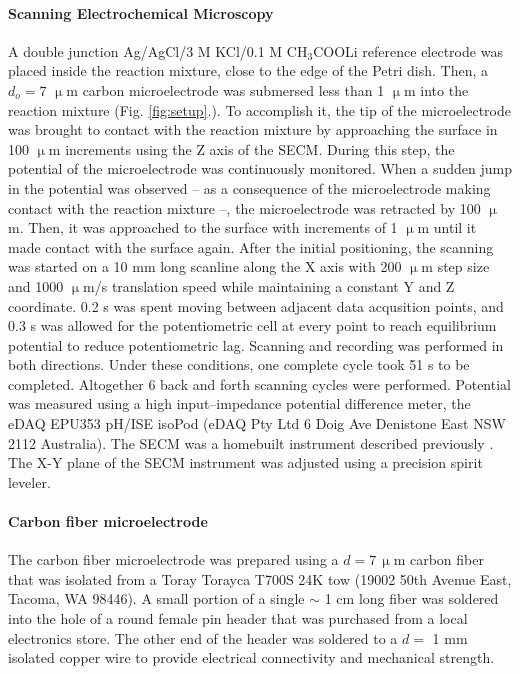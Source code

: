 \documentclass[3p, twocolumn]{elsarticle}
\begin{document}
\paragraph{Scanning Electrochemical Microscopy} A double junction Ag/AgCl/3 M KCl/0.1 M CH$_3$COOLi reference electrode was placed inside the reaction mixture, close to the edge of the Petri dish.
Then, a $d_o=7$ $\upmu$m carbon microelectrode was submersed less than 1 $\upmu$m into the reaction mixture (Fig. \ref{fig:setup}.).
To accomplish it, the tip of the microelectrode was brought to contact with the reaction mixture by approaching the surface in 100 $\upmu$m increments using the Z axis of the SECM.
During this step, the potential of the microelectrode was continuously monitored.
When a sudden jump in the potential was observed -- as a consequence of the microelectrode making contact with the reaction mixture --, the microelectrode was retracted by 100 $\upmu$m.
Then, it was approached to the surface with increments of 1 $\upmu$m until it made contact with the surface again.
After the initial positioning, the scanning was started on a 10 mm long scanline along the X axis with 200 $\upmu$m step size and 1000 $\upmu$m/s translation speed while maintaining a constant Y and Z coordinate.
0.2 s was spent moving between adjacent data acqusition points, and 0.3 s was allowed for the potentiometric cell at every point to reach equilibrium potential to reduce potentiometric lag.
Scanning and recording was performed in both directions.
Under these conditions, one complete cycle took 51 s to be completed.
Altogether 6 back and forth scanning cycles were performed.
Potential was measured using a high input--impedance potential difference meter, the eDAQ EPU353 pH/ISE isoPod (eDAQ Pty Ltd 6 Doig Ave Denistone East NSW 2112 Australia).
The SECM was a homebuilt instrument described previously \cite{andras2017recent}.
The X-Y plane of the SECM instrument was adjusted using a precision spirit leveler.

\paragraph{Carbon fiber microelectrode} The carbon fiber microelectrode was prepared using a $d=7\, \upmu$m carbon fiber that was isolated from a Toray Torayca T700S 24K tow (19002 50th Avenue East, Tacoma, WA 98446).
A small portion of a single $\sim$ 1 cm long fiber was soldered into the hole of a round female pin header that was purchased from a local electronics store. 
The other end of the header was soldered to a $d=$ 1 mm isolated copper wire to provide electrical connectivity and mechanical strength. 
\end{document}
